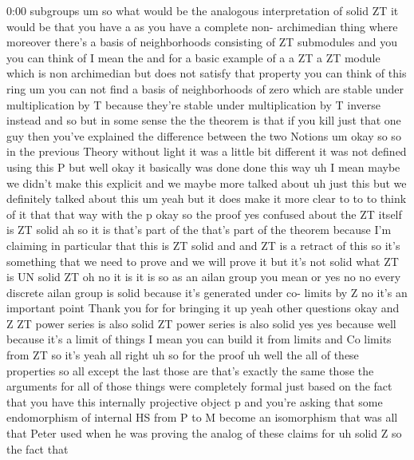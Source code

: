 \begin{unfinished}{0:00}
subgroups
um  so  what  would  be  the  analogous
interpretation  of  solid  ZT  it  would  be
that  you  have  a  as  you  have  a  complete
non-  archimedian  thing  where  moreover
there's  a  basis  of  neighborhoods
consisting  of  ZT  submodules
and  you  you  can  think  of  I  mean  the  and
for  a  basic  example  of  a  a  ZT  a  ZT
module  which  is  non  archimedian  but  does
not  satisfy  that  property  you  can  think
of  this  ring
um  you  can  not  find  a  basis  of
neighborhoods  of  zero  which  are  stable
under  multiplication  by  T  because
they're  stable  under  multiplication  by  T
inverse  instead  and  so  but  in  some  sense
the  the  theorem  is  that  if  you  kill  just
that  one  guy  then  you've  explained  the
difference  between  the  two
Notions  um
okay
so  so  in  the  previous  Theory  without
light  it  was  a  little  bit  different  it
was  not  defined
using  this  P
but  well  okay  it  basically  was  done  done
this  way  uh  I  mean  maybe  we  didn't  make
this
explicit  and  we  maybe  more  talked  about
uh  just  this  but  we  definitely  talked
about  this  um  yeah  but  it  does  make  it
more  clear  to  to  to  think  of  it  that
that  way  with  the
p  okay  so  the
proof  yes  confused  about  the  ZT  itself
is  ZT  solid  ah  so  it  is  that's  part  of
the  that's  part  of  the  theorem  because
I'm  claiming  in  particular  that  this  is
ZT  solid  and  and  ZT  is  a  retract  of  this
so  it's  something  that  we  need  to  prove
and  we  will  prove  it  but  it's  not  solid
what  ZT  is  UN  solid  ZT  oh  no  it  is  it  is
so  as  an  ailan  group  you  mean  or  yes  no
no  every  discrete  ailan  group  is  solid
because  it's  generated  under  co-  limits
by  Z  no  it's  an  important  point  Thank
you  for  for  bringing  it  up
yeah  other
questions  okay  and  Z  ZT  power  series  is
also  solid  ZT  power  series  is  also  solid
yes  yes  because  well  because  it's  a
limit  of  things  I  mean  you  can  build  it
from  limits  and  Co  limits  from  ZT  so
it's
yeah  all
right  uh  so  for  the  proof  uh  well  the
all  of  these
properties  so  all  except  the
last
those  are  that's  exactly  the
same  those  the  arguments  for  all  of
those  things  were  completely  formal  just
based  on  the  fact  that  you  have  this
internally  projective  object  p  and
you're  asking  that  some  endomorphism  of
internal  HS  from  P  to  M  become  an
isomorphism  that  was  all  that  Peter  used
when  he  was  proving  the  analog  of  these
claims  for  uh  solid  Z  so  the  fact  that

\end{unfinished}
